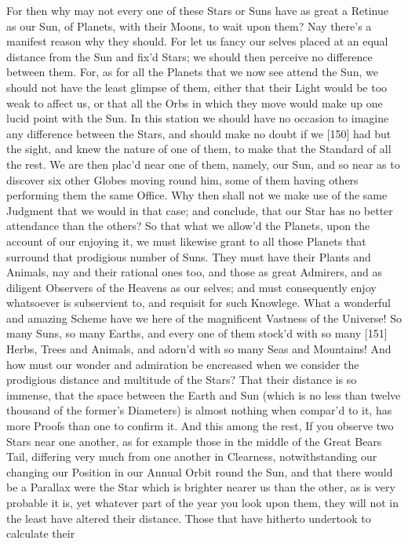 \documentclass[letterpaper]{book}
\begin{document}
For then why may not every one of these Stars or Suns have as great a
Retinue as our Sun, of Planets, with their Moons, to wait upon them? Nay
there's a manifest reason why they should. For let us fancy our selves
placed at an equal distance from the Sun and fix'd Stars; we should then
perceive no difference between them. For, as for all the Planets that we now
see attend the Sun, we should not have the least glimpse of them, either
that their Light would be too weak to affect us, or that all the Orbs in
which they move would make up one lucid point with the Sun. In this station
we should have no occasion to imagine any difference between the Stars, and
should make no doubt if we [150] had but the sight, and knew the nature of
one of them, to make that the Standard of all the rest. We are then plac'd
near one of them, namely, our Sun, and so near as to discover six other
Globes moving round him, some of them having others performing them the same
Office.  Why then shall not we make use of the same Judgment that we would
in that case; and conclude, that our Star has no better attendance than the
others?  So that what we allow'd the Planets, upon the account of our
enjoying it, we must likewise grant to all those Planets that surround that
prodigious number of Suns. They must have their Plants and Animals, nay and
their rational ones too, and those as great Admirers, and as diligent
Observers of the Heavens as our selves; and must consequently enjoy
whatsoever is subservient to, and requisit for such Knowlege.  What a
wonderful and amazing Scheme have we here of the magnificent Vastness of the
Universe! So many Suns, so many Earths, and every one of them stock'd with
so many [151] Herbs, Trees and Animals, and adorn'd with so many Seas and
Mountains! And how must our wonder and admiration be encreased when we
consider the prodigious distance and multitude of the Stars?  That their
distance is so immense, that the space between the Earth and Sun (which is
no less than twelve thousand of the former's Diameters) is almost nothing
when compar'd to it, has more Proofs than one to confirm it. And this among
the rest, If you observe two Stars near one another, as for example those in
the middle of the Great Bears Tail, differing very much from one another in
Clearness, notwithstanding our changing our Position in our Annual Orbit
round the Sun, and that there would be a Parallax were the Star which is
brighter nearer us than the other, as is very probable it is, yet whatever
part of the year you look upon them, they will not in the least have altered
their distance. Those that have hitherto undertook to calculate their
\end{document}

